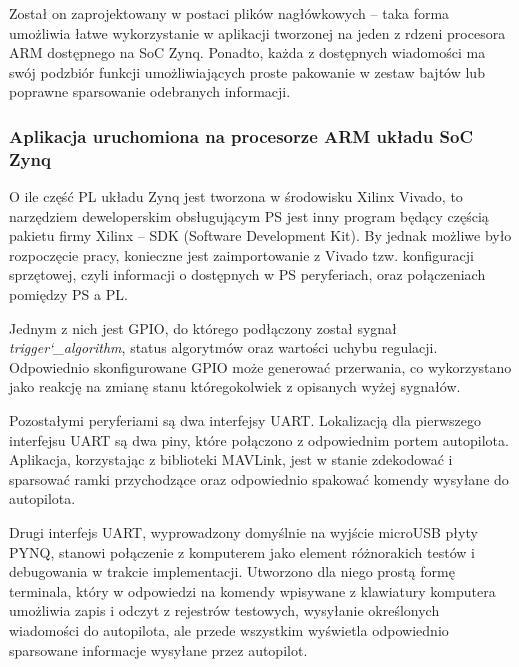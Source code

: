 Został on zaprojektowany w postaci plików nagłówkowych -- taka forma umożliwia łatwe wykorzystanie w aplikacji tworzonej na jeden z rdzeni procesora ARM dostępnego na SoC Zynq. %
Ponadto, każda z dostępnych wiadomości ma swój podzbiór funkcji umożliwiających proste pakowanie w zestaw bajtów lub poprawne sparsowanie odebranych informacji.



\subsubsection{Aplikacja uruchomiona na procesorze ARM układu SoC Zynq}

O ile część PL układu Zynq jest tworzona w środowisku Xilinx Vivado, to narzędziem deweloperskim obsługującym PS jest inny program będący częścią pakietu firmy Xilinx -- SDK (Software Development Kit). %
By jednak możliwe było rozpoczęcie pracy, konieczne jest zaimportowanie z Vivado tzw. konfiguracji sprzętowej, czyli informacji o dostępnych w PS peryferiach, oraz połączeniach pomiędzy PS a PL.

Jednym z nich jest GPIO, do którego podłączony został sygnał \textit{trigger\char`_algorithm}, status algorytmów oraz wartości uchybu regulacji. %
Odpowiednio skonfigurowane GPIO może generować przerwania, co wykorzystano jako reakcję na zmianę stanu któregokolwiek z opisanych wyżej sygnałów.

Pozostałymi peryferiami są dwa interfejsy UART. 
Lokalizacją dla pierwszego interfejsu UART są dwa piny, które połączono z odpowiednim portem autopilota. 
Aplikacja, korzystając z biblioteki MAVLink, jest w stanie zdekodować i sparsować ramki przychodzące oraz odpowiednio spakować komendy wysyłane do autopilota.

Drugi interfejs UART, wyprowadzony domyślnie na wyjście microUSB płyty PYNQ, stanowi połączenie z komputerem jako element różnorakich testów i debugowania w trakcie implementacji. 
Utworzono dla niego prostą formę terminala, który w odpowiedzi na komendy wpisywane z klawiatury komputera umożliwia zapis i odczyt z rejestrów testowych, wysyłanie określonych wiadomości do autopilota, ale przede wszystkim wyświetla odpowiednio sparsowane informacje wysyłane przez autopilot.

